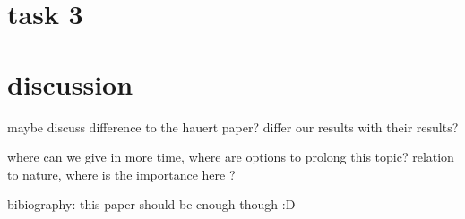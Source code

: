 \documentclass[DIV=calc, paper=a4, fontsize=11pt, twocolumn]{scrartcl}	 %
\begin{document}
\section*{task 3}

\section*{discussion}

maybe discuss difference to the hauert paper? 
differ our results with their results? 

where can we give in more time, where are options to prolong this topic? relation to nature, where is the importance here ? 

bibiography: this paper should be enough though :D 

\nocite{Albizu2013}



\end{document}
